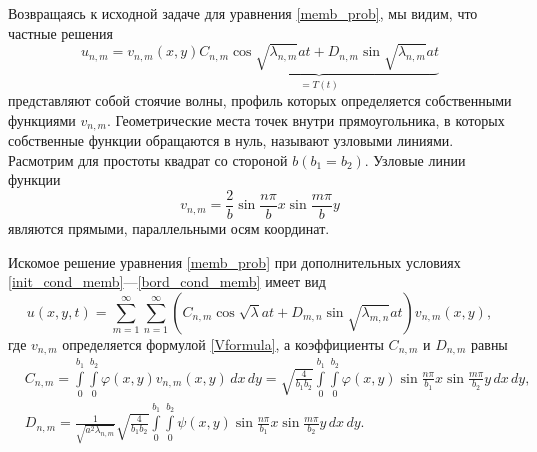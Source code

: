 Возвращаясь к исходной задаче для уравнения \eqref{memb_prob}, мы видим, что частные решения
\begin{equation}
	u_{n, m} = v_{n, m}(x, y) \underbrace{C_{n, m} \cos{\sqrt{\lambda_{n, m}} a t} + D_{n, m} \sin{\sqrt{\lambda_{n, m}} a t}}_{=T(t)}
\end{equation}
представляют собой стоячие волны, профиль которых определяется собственными функциями $v_{n, m}$. Геометрические места точек внутри прямоугольника, в которых собственные функции обращаются в нуль, называют узловыми линиями. Расмотрим для простоты квадрат со стороной $b (b_1 = b_2)$. Узловые линии функции 
\begin{equation}
	v_{n, m} = \frac{2}{b} \sin{\frac{n \pi}{b} x} \sin{\frac{m \pi}{b} y}
\end{equation}
являются прямыми, параллельными осям координат. 

Искомое решение уравнения \eqref{memb_prob} при дополнительных условиях \eqref{init_cond_memb}---\eqref{bord_cond_memb} имеет вид
\begin{equation*}
	u(x, y, t) = \sum \limits_{m = 1}^{\infty} \sum \limits_{n = 1}^{\infty} (C_{n, m} \cos{\sqrt{\lambda} a t} + D_{m, n} \sin{\sqrt{\lambda_{m, n}} a t}) v_{n, m}(x, y),
\end{equation*}
где $v_{n, m}$ определяется формулой \eqref{Vformula}, а коэффициенты $C_{n, m}$ и $D_{n, m}$ равны
\begin{align*}
	&C_{n, m} = \int \limits_{0}^{b_1} \int \limits_{0}^{b_2} \varphi(x, y) v_{n, m}(x, y) \, dx \, dy = \sqrt{\frac{4}{b_1 b_2}} \int \limits_{0}^{b_1} \int \limits_{0}^{b_2} \varphi(x, y) \sin{\frac{n \pi}{b_1} x} \sin{\frac{m \pi}{b_2} y} \, dx \, dy, \\
	&D_{n, m} = \frac{1}{\sqrt{a^2 \lambda_{n, m}}} \sqrt{\frac{4}{b_1 b_2}} \int \limits_{0}^{b_1} \int \limits_{0}^{b_2} \psi(x, y) \sin{\frac{n \pi}{b_1} x} \sin{\frac{m \pi}{b_2} y} \, dx \, dy. 
\end{align*}
